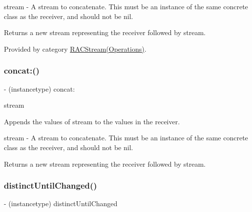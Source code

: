 stream -\/ A stream to concatenate. This must be an instance of the same concrete class as the receiver, and should not be {\ttfamily nil}.

Returns a new stream representing the receiver followed by {\ttfamily stream}. 

Provided by category \mbox{\hyperlink{category_r_a_c_stream_07_operations_08_ad768270f8b0a075337cf91bec9420530}{R\+A\+C\+Stream(\+Operations)}}.

\mbox{\label{interface_r_a_c_stream_aa6ba0c467e804ce813a0c6b627043ec3}} 
\subsubsection{\texorpdfstring{concat\+:()}{concat:()}\hspace{0.1cm}{\footnotesize\ttfamily [3/3]}}
{\footnotesize\ttfamily -\/ (instancetype) concat\+: \begin{DoxyParamCaption}\item[{(\mbox{\hyperlink{interface_r_a_c_stream}{R\+A\+C\+Stream}} $\ast$)}]{stream }\end{DoxyParamCaption}}

Appends the values of {\ttfamily stream} to the values in the receiver.

stream -\/ A stream to concatenate. This must be an instance of the same concrete class as the receiver, and should not be {\ttfamily nil}.

Returns a new stream representing the receiver followed by {\ttfamily stream}. \mbox{\label{interface_r_a_c_stream_a3af010b929b0c232ddbaa52f574fb888}} 
\subsubsection{\texorpdfstring{distinct\+Until\+Changed()}{distinctUntilChanged()}\hspace{0.1cm}{\footnotesize\ttfamily [1/3]}}
{\footnotesize\ttfamily -\/ (instancetype) distinct\+Until\+Changed \begin{DoxyParamCaption}{ }\end{DoxyParamCaption}}

